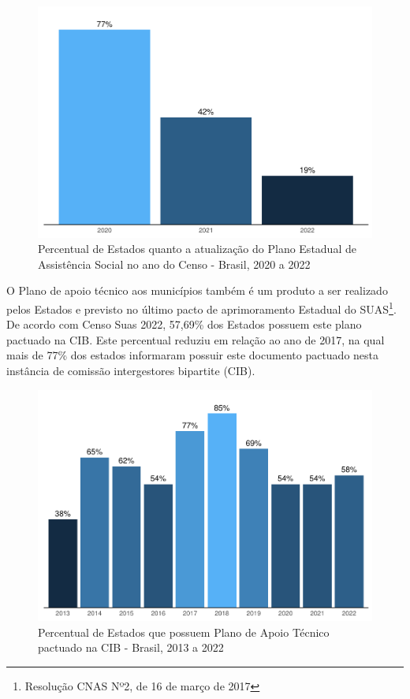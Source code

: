 \documentclass[
  brazilian]{report}
\begin{document}
\begin{figure}
\includegraphics{Censo-SUAS-2022_files/figure-latex/PEAS-1} \caption[Percentual de Estados quanto a atualização do Plano Estadual de Assistência Social no ano do Censo - Brasil, 2020 a 2022]{Percentual de Estados quanto a atualização do Plano Estadual de Assistência Social no ano do Censo - Brasil, 2020 a 2022}\label{fig:PEAS}
\end{figure}

O Plano de apoio técnico aos municípios também é um produto a ser
realizado pelos Estados e previsto no último pacto de aprimoramento
Estadual do SUAS\footnote{Resolução CNAS Nº2, de 16 de março de 2017}.
De acordo com Censo Suas 2022, 57,69\% dos Estados possuem este plano
pactuado na CIB. Este percentual reduziu em relação ao ano de 2017, na
qual mais de 77\% dos estados informaram possuir este documento pactuado
nesta instância de comissão intergestores bipartite (CIB).

\begin{figure}
\includegraphics{Censo-SUAS-2022_files/figure-latex/plan_apoio_tec-1} \caption[Percentual de Estados que possuem Plano de Apoio Técnico pactuado na CIB - Brasil, 2013 a 2022]{Percentual de Estados que possuem Plano de Apoio Técnico pactuado na CIB - Brasil, 2013 a 2022}\label{fig:plan_apoio_tec}
\end{figure}
\end{document}
